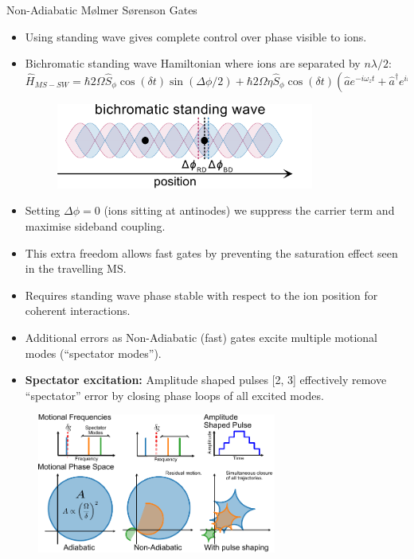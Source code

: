 \documentclass[final]{beamer}
\begin{document}
\begin{frame}{}
\begin{center}
\begin{columns}[t]
\begin{column}{0.49\textwidth}
\begin{alertblock}{Non-Adiabatic Mølmer Sørenson Gates}

     \vspace*{-3.5em}
      \begin{itemize}
      \item Using standing wave gives complete control over phase
        visible to ions.
      \item Bichromatic standing wave Hamiltonian where ions are
        separated by $n\lambda/2$:
      \large$$ \hat{H}_{MS-SW} = \hbar 2\Omega \hat{S}_{\phi}\cos{(\delta t)}\sin{(\Delta\phi/2)} + \hbar 2\Omega\eta \hat{S}_\phi\cos{(\delta t)}(\hat{a}e^{-i\omega_zt} + \hat{a}^\dagger e^{i\omega_zt})\cos{(\Delta\phi/2)}$$\normalsize
      \begin{figure}
        \includegraphics[width=0.8\textwidth]{./figs/bichro.pdf}
      \end{figure}
      \item Setting $\Delta\phi = 0$ (ions sitting at antinodes) we
        suppress the carrier term and maximise sideband
        coupling.
      \item This extra freedom allows fast gates by preventing the
        saturation effect seen in the travelling MS.
      \item Requires standing wave phase stable with respect to the ion position for
            coherent interactions.\\

      \item Additional errors as Non-Adiabatic (fast) gates excite multiple motional modes (``spectator modes'').
      \item \textbf{Spectator excitation:} Amplitude shaped pulses
        [2, 3] effectively remove ``spectator'' error by closing
        phase loops of all excited modes.
      \end{itemize}
      \begin{figure}
        \includegraphics[width=0.7\textwidth]{./figs/phase_loops_fig_bumpy.pdf}
      \end{figure}
    \end{alertblock}


\end{column}
\end{columns}
\end{center}
\end{frame}
\end{document}
